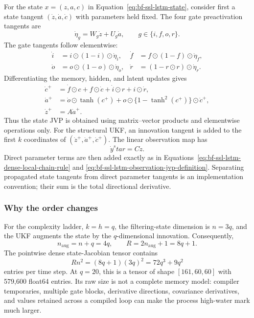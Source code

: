 For the state $x=(z,a,c)$ in Equation~\eqref{eq:bf-ssl-lstm-state}, consider
first a state tangent $(\dot z,\dot a,\dot c)$ with parameters held fixed.
The four gate preactivation tangents are
\begin{equation}
  \dot\eta_g=W_g\dot z+U_g\dot a,
  \qquad g\in\{i,f,o,r\}.
  \label{eq:bf-ssl-lstm-gate-preactivation-jvp}
\end{equation}
The gate tangents follow elementwise:
\begin{align}
  \dot i &=i\odot(1-i)\odot\dot\eta_i, &
  \dot f &=f\odot(1-f)\odot\dot\eta_f, \\
  \dot o &=o\odot(1-o)\odot\dot\eta_o, &
  \dot r &=(1-r\odot r)\odot\dot\eta_r.
  \label{eq:bf-ssl-lstm-gate-jvp}
\end{align}
Differentiating the memory, hidden, and latent updates gives
\begin{align}
  \dot c^+
    &=\dot f\odot c+f\odot\dot c
      +\dot i\odot r+i\odot\dot r, \\
  \dot a^+
    &=\dot o\odot\tanh(c^+)
      +o\odot\{1-\tanh^2(c^+)\}\odot\dot c^+, \\
  \dot z^+&=A\dot a^+.
  \label{eq:bf-ssl-lstm-state-jvp}
\end{align}
Thus the state JVP is obtained using matrix--vector products and elementwise
operations only.  For the structural UKF, an innovation tangent is added to
the first $k$ coordinates of $(\dot z^+,\dot a^+,\dot c^+)$.  The linear
observation map has
\begin{equation}
  \dot y^star=C\dot z.
  \label{eq:bf-ssl-lstm-observation-state-jvp}
\end{equation}
Direct parameter terms are then added exactly as in
Equations~\eqref{eq:bf-ssl-lstm-dense-local-chain-rule} and
\eqref{eq:bf-ssl-lstm-observation-jvp-definition}.  Separating propagated
state tangents from direct parameter tangents is an implementation convention;
their sum is the total directional derivative.

\subsubsection{Why the order changes}

For the complexity ladder, $k=h=q$, the filtering-state dimension is
$n=3q$, and the UKF augments the state by the $q$-dimensional innovation.
Consequently,
\begin{equation}
  n_{\mathrm{aug}}=n+q=4q,
  \qquad R=2n_{\mathrm{aug}}+1=8q+1.
  \label{eq:bf-ssl-lstm-ukf-point-count}
\end{equation}
The pointwise dense state-Jacobian tensor contains
\begin{equation}
  Rn^2=(8q+1)(3q)^2=72q^3+9q^2
  \label{eq:bf-ssl-lstm-dense-jacobian-entry-count}
\end{equation}
entries per time step.  At $q=20$, this is a tensor of shape
$[161,60,60]$ with 579,600 float64 entries.  Its raw size is not a complete
memory model: compiler temporaries, multiple gate blocks, derivative
directions, covariance derivatives, and values retained across a compiled
loop can make the process high-water mark much larger.


